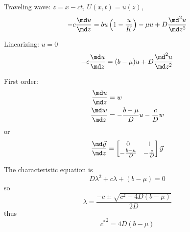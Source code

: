 \documentclass{jpmarticle}
\begin{document}
Traveling wave: $z = x - c t$, $U(x, t) = u(z)$,
\begin{equation}
  - c \frac{\md u}{\md z}
  = b u \left(1 - \frac{u}{K}\right)
  - \mu u
  + D \frac{\md^2 u}{\md z^2}
\end{equation}

Linearizing: $u = 0$
\begin{equation}
  - c \frac{\md u}{\md z}
  =
  (b - \mu) u
  + D \frac{\md^2 u}{\md z^2}
\end{equation}

First order:
\begin{equation}
  \begin{split}
    \frac{\md u}{\md z} &= w
    \\
    \frac{\md w}{\md z}
    &=
    - \frac{b - \mu}{D} u
    - \frac{c}{D} w
  \end{split}
\end{equation}
or
\begin{equation}
  \frac{\md \vec{y}}{\md z}
  =
  \begin{bmatrix}
    0 & 1 \\
    - \frac{b - \mu}{D} & - \frac{c}{D}
  \end{bmatrix}
  \vec{y}
\end{equation}

The characteristic equation is
\begin{equation}
  D \lambda^2 + c \lambda + (b - \mu) = 0
\end{equation}
so
\begin{equation}
  \lambda = \frac{- c \pm \sqrt{c^2 - 4 D (b - \mu)}}{2 D}
\end{equation}
thus
\begin{equation}
  {c^*}^2 = 4 D (b - \mu)
\end{equation}
\end{document}
